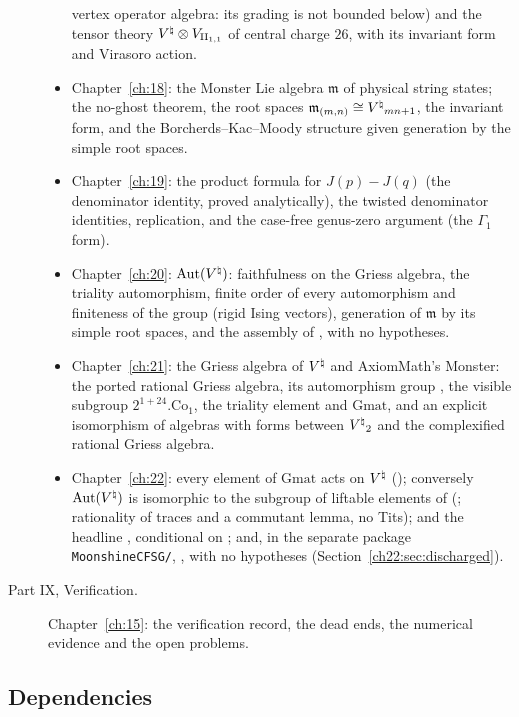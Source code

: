 \begin{description}
\begin{itemize}
    vertex operator algebra: its grading is not bounded below) and the tensor theory $\Vnat\otimes V_{\mathrm{II}_{1,1}}$
    of central charge $26$, with its invariant form and Virasoro action.
  \item Chapter~\ref{ch:18}: the Monster Lie algebra $\mathfrak m$ of physical string states; the no-ghost theorem,
    the root spaces $\mathfrak m_{(m,n)}\cong{V^{\natural}}_{mn+1}$, the invariant form, and the Borcherds--Kac--Moody structure
    given generation by the simple root spaces.
  \item Chapter~\ref{ch:19}: the product formula for $J(p)-J(q)$ (the denominator identity, proved analytically), the
    twisted denominator identities, replication, and the case-free genus-zero argument (the $\Gamma_1$ form).
  \item Chapter~\ref{ch:20}: $\operatorname{Aut}({V^{\natural}})$: faithfulness on the Griess algebra, the triality automorphism, finite order
    of every automorphism and finiteness of the group (rigid Ising vectors), generation of $\mathfrak m$ by its simple
    root spaces, and the assembly of , with no hypotheses.
  \item Chapter~\ref{ch:21}: the Griess algebra of ${V^{\natural}}$ and AxiomMath's Monster: the ported rational Griess
    algebra, its automorphism group , the visible subgroup $2^{1+24}.\mathrm{Co}_1$, the triality element and
    $\mathrm{Gmat}$, and an explicit isomorphism of algebras with forms between ${V^{\natural}}_2$ and the complexified rational
    Griess algebra.
  \item Chapter~\ref{ch:22}: every element of $\mathrm{Gmat}$ acts on ${V^{\natural}}$ (); conversely
    $\operatorname{Aut}({V^{\natural}})$ is isomorphic to the subgroup of liftable elements of 
    (; rationality of traces and a commutant lemma, no Tits); and the headline
    , conditional on ; and, in the separate package \texttt{MoonshineCFSG/},
    , with no hypotheses (Section~\ref{ch22:sec:discharged}).
  \end{itemize}
\item[Part IX, Verification.] Chapter~\ref{ch:15}: the verification record, the dead ends, the
  numerical evidence and the open problems.
\end{description}

\subsection{Dependencies}

